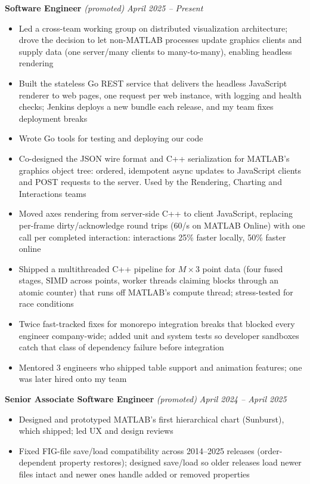 \documentclass{article}
\begin{document}
{\large \textbf{Software Engineer}} \textit{(promoted)} \hfill \textit{April 2025 -- Present}
\begin{itemize}[leftmargin=*]
    \item Led a cross-team working group on distributed visualization architecture; drove the decision to let non-MATLAB processes update graphics clients and supply data (one server\slash many clients to many-to-many), enabling headless rendering
    \item Built the stateless Go REST service that delivers the headless JavaScript renderer to web pages, one request per web instance, with logging and health checks; Jenkins deploys a new bundle each release, and my team fixes deployment breaks
    \item Wrote Go tools for testing and deploying our code
    \item Co-designed the JSON wire format and C++ serialization for MATLAB's graphics object tree: ordered, idempotent async updates to JavaScript clients and POST requests to the server. Used by the Rendering, Charting and Interactions teams
    \item Moved axes rendering from server-side C++ to client JavaScript, replacing per-frame dirty/acknowledge round trips (60/s on MATLAB Online) with one call per completed interaction: interactions 25\% faster locally, 50\% faster online
    \item Shipped a multithreaded C++ pipeline for $M \times 3$ point data (four fused stages, SIMD across points, worker threads claiming blocks through an atomic counter) that runs off MATLAB's compute thread; stress-tested for race conditions
    \item Twice fast-tracked fixes for monorepo integration breaks that blocked every engineer company-wide; added unit and system tests so developer sandboxes catch that class of dependency failure before integration
    \item Mentored 3 engineers who shipped table support and animation features; one was later hired onto my team
\end{itemize}

{\large \textbf{Senior Associate Software Engineer}} \textit{(promoted)} \hfill \textit{April 2024 -- April 2025}
\begin{itemize}[leftmargin=*]
    \item Designed and prototyped MATLAB's first hierarchical chart (Sunburst), which shipped; led UX and design reviews
    \item Fixed FIG-file save/load compatibility across 2014--2025 releases (order-dependent property restores); designed save/load so older releases load newer files intact and newer ones handle added or removed properties
\end{itemize}
\end{document}
